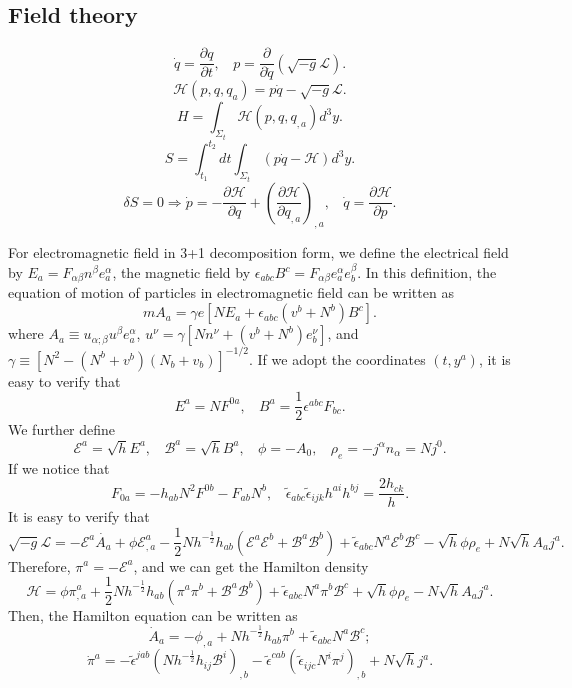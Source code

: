 \subsection{Field theory}
\[\dot{q} = \frac{\partial q}{\partial t}, \ \ \ \ p=\frac{\partial}{\partial \dot{q}}(\sqrt{-g} \mathcal{L}).\]
\[\mathcal{H}(p,q,q_a) = p\dot{q} - \sqrt{-g} \mathcal{L}.\]
\[H = \int_{\Sigma_t} \mathcal{H}(p,q,q_{,a})d^3y.\]
\[S = \int_{t_1}^{t_2} dt \int_{\Sigma_t} (p \dot{q} - \mathcal{H} ) d^3 y.\]
\[\delta S = 0 \Rightarrow \dot{p} = -\frac{\partial \mathcal{H}}{\partial q} + \left(\frac{\partial \mathcal{H}}{\partial q_{,a}}\right)_{,a}, \ \ \ \ \dot{q} = \frac{\partial \mathcal{H}}{\partial p}.\]
\begin{example}
For electromagnetic field in 3+1 decomposition form, we define the electrical field by $E_a = F_{\alpha \beta} n^{\beta} e_a^{\alpha}$, the magnetic field by $\epsilon_{abc} B^c = F_{\alpha \beta} e_a^{\alpha} e_b^{\beta}$. 
In this definition, the equation of motion of particles in electromagnetic field can be written as
\[m A_a = \gamma e [NE_a + \epsilon_{abc} (v^b+N^b) B^c].\]
where $A_a \equiv u_{\alpha;\beta} u^{\beta} e_a^{\alpha}$, $u^{\nu} = \gamma [Nn^{\nu} + (v^b + N^b) e_{b}^{\nu}]$, and $\gamma \equiv [N^2-(N^b+v^b)(N_b+v_b)]^{-1/2}$.
If we adopt the coordinates $(t,y^a)$, it is easy to verify that
\[E^a = N F^{0a}, \ \ \ \ B^a = \frac{1}{2} \epsilon^{abc} F_{bc}.\]
We further define
\[\mathcal{E}^a = \sqrt{h} E^a, \ \ \ \ \mathcal{B}^a = \sqrt{h} B^a, \ \ \ \ \phi = - A_0, \ \ \ \ \rho_{e} = -j^{\alpha} n_{\alpha} = N j^0.\]
If we notice that
\[F_{0a} = -h_{ab}N^2F^{0b} - F_{ab}N^b, \ \ \ \ \tilde{\epsilon}_{abc} \tilde{\epsilon}_{ijk} h^{ai} h^{bj} = \frac{2h_{ck}}{h}.\]
It is easy to verify that
\[ \sqrt{-g} \mathcal{L} = - \mathcal{E}^a \dot{A_a} + \phi \mathcal{E}^a_{,a} - \frac{1}{2} N h^{-\frac{1}{2}} h_{ab} (\mathcal{E}^a \mathcal{E}^b + \mathcal{B}^a \mathcal{B}^b) + \tilde{\epsilon}_{abc}N^a \mathcal{E}^b \mathcal{B}^c -\sqrt{h} \phi \rho_e + N \sqrt{h} A_a j^a.\]
Therefore, $\pi^a = -\mathcal{E}^a$, and we can get the Hamilton density
\[\mathcal{H} = \phi \pi^a_{,a} + \frac{1}{2} N h^{-\frac{1}{2}} h_{ab} (\pi^a \pi^b + \mathcal{B}^a \mathcal{B}^b) + \tilde{\epsilon}_{abc}N^a \pi^b \mathcal{B}^c +\sqrt{h} \phi \rho_e - N \sqrt{h} A_a j^a.\]
Then, the Hamilton equation can be written as
\[\dot{A}_a = -\phi_{,a} + N h^{-\frac{1}{2}} h_{ab}\pi^b + \tilde{\epsilon}_{abc}N^a \mathcal{B}^c;\]
\[\dot{\pi}^a = - \tilde{\epsilon}^{jab}(Nh^{-\frac{1}{2}}h_{ij}\mathcal{B}^i)_{,b} - \tilde{\epsilon}^{cab}(\tilde{\epsilon}_{ijc}N^i \pi^j)_{,b} + N\sqrt{h}j^a .\]

\end{example}
